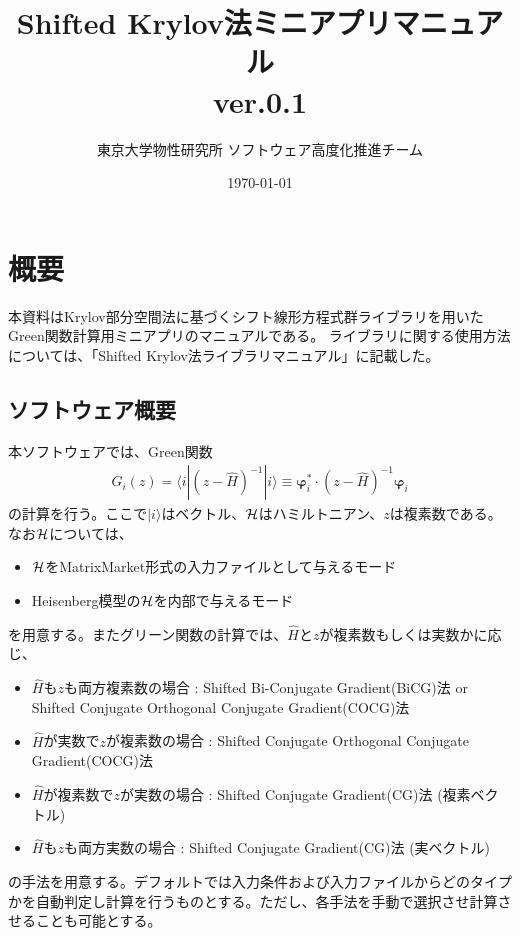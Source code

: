 \documentclass[12pt,titlepage]{jarticle}
\begin{document}
%
%
\title{Shifted Krylov法ミニアプリマニュアル \\
  ver.0.1}
\author{東京大学物性研究所 ソフトウェア高度化推進チーム}
\date{\today}
\maketitle
%

%
%
\tableofcontents

\newpage
\section{概要}

本資料はKrylov部分空間法に基づくシフト線形方程式群ライブラリを用いた
Green関数計算用ミニアプリのマニュアルである。
ライブラリに関する使用方法については、「Shifted Krylov法ライブラリマニュアル」に記載した。

\subsection{ソフトウェア概要}
本ソフトウェアでは、Green関数
\begin{align}
  G_{i}(z) = \langle i | (z-{\hat H})^{-1}| i \rangle \equiv 
  {\boldsymbol \varphi}_i^{*} \cdot (z-{\hat H})^{-1} {\boldsymbol \varphi}_i
\end{align}
の計算を行う。ここで$| i \rangle $はベクトル、${\cal H}$はハミルトニアン、$z$は複素数である。\\
なお${\cal H}$については、
\begin{itemize}
\item{${\cal H}$をMatrixMarket形式の入力ファイルとして与えるモード}
\item{Heisenberg模型の${\cal H}$を内部で与えるモード}
\end{itemize}
を用意する。またグリーン関数の計算では、${\hat H}$と$z$が複素数もしくは実数かに応じ、
\begin{itemize}
\item ${\hat H}$も$z$も両方複素数の場合 : Shifted Bi-Conjugate Gradient(BiCG)法 or Shifted Conjugate Orthogonal Conjugate Gradient(COCG)法 
\item ${\hat H}$が実数で$z$が複素数の場合 : Shifted Conjugate Orthogonal Conjugate Gradient(COCG)法 
\item ${\hat H}$が複素数で$z$が実数の場合 : Shifted Conjugate Gradient(CG)法 (複素ベクトル)
\item ${\hat H}$も$z$も両方実数の場合 : Shifted Conjugate Gradient(CG)法 (実ベクトル)
\end{itemize}
の手法を用意する。デフォルトでは入力条件および入力ファイルからどのタイプかを自動判定し計算を行うものとする。ただし、各手法を手動で選択させ計算させることも可能とする。
\end{document}
